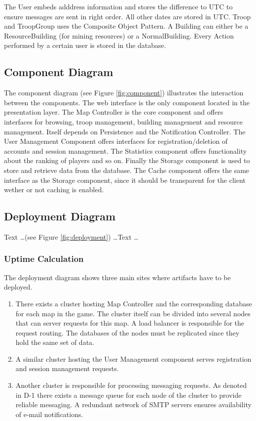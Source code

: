 \documentclass[11pt]{article}
\begin{document}
The User embeds adddress information and stores the difference to UTC to ensure messages are sent in right order. All other dates are stored in UTC. Troop and TroopGroup uses the Composite Object Pattern. A Building can either be a ResourceBuilding (for mining resources) or a NormalBuilding. Every Action performed by a certain user is stored in the database.

\subsection{Component Diagram}

The component diagram (see Figure \ref{fig:component}) illustrates the interaction between the components. The web  interface is the only component located in the presentation layer. The Map Controller is the core component and offers interfaces for browsing, troop management, building management and resource management. Itself depends on Persistence and the Notification Controller. The User Management Component offers interfaces for registration/deletion of accounts and session management. The Statistics component offers functionality about the ranking of players and so on. Finally the Storage component is used to store and retrieve data from the database. The Cache component offers the same interface as the Storage component, since it should be transparent for the client wether or not caching is enabled.

\subsection{Deployment Diagram}

Text \dots (see Figure \ref{fig:deployment}) \dots Text \dots

\subsubsection{Uptime Calculation}

The deployment diagram shows three main sites where artifacts have to be deployed. 
\begin{enumerate}
\item There exists a cluster hosting Map Controller and the corresponding database for each map in the game. The cluster itself can be divided into several nodes that can server requests for this map. A load balancer is responsible for the request routing. The databases of the nodes must be replicated since they hold the same set of data.
\item A similar cluster hosting the User Management component serves registration and session management requests.
\item Another cluster is responsible for processing messaging requests. As denoted in D-1 there exists a message queue for each node of the cluster to provide reliable messaging. A redundant network of SMTP servers ensures availability of e-mail notifications.
\end{enumerate}
\end{document}
